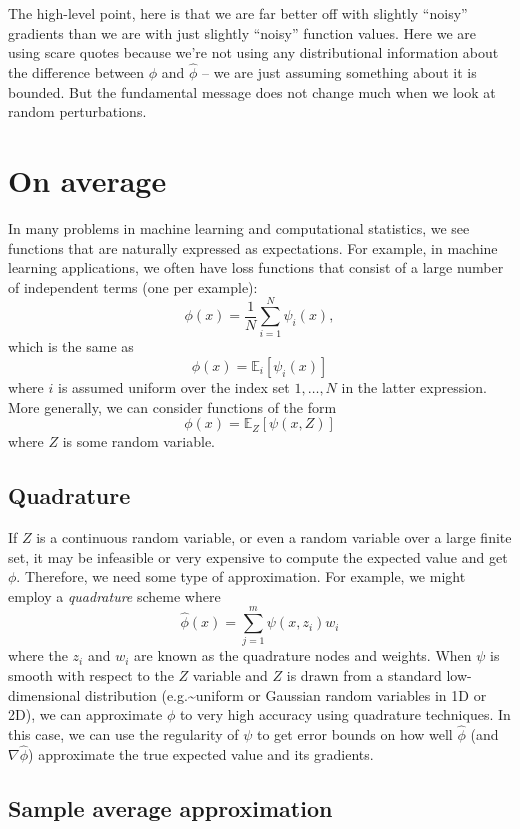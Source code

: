 \documentclass[12pt, leqno]{article} %
\begin{document}
The high-level point, here is that we are far better off with slightly
``noisy'' gradients than we are with just slightly ``noisy'' function
values. Here we are using scare quotes because we're not using any
distributional information about the difference between \(\phi\) and
\(\hat{\phi}\) -- we are just assuming something about it is bounded.
But the fundamental message does not change much when we look at random
perturbations.

\section{On average}

In many problems in machine learning and computational statistics, we
see functions that are naturally expressed as expectations. For example,
in machine learning applications, we often have loss functions that
consist of a large number of independent terms (one per example):
\[\phi(x) = \frac{1}{N} \sum_{i=1}^N \psi_i(x),\] which is the same as
\[\phi(x) = \mathbb{E}_i\left[ \psi_i(x) \right]\] where \(i\) is
assumed uniform over the index set \(1, \ldots, N\) in the latter
expression. More generally, we can consider functions of the form
\[\phi(x) = \mathbb{E}_Z\left[\psi(x, Z)\right]\] where \(Z\) is some
random variable.

\subsection{Quadrature}

If \(Z\) is a continuous random variable, or even a random variable over
a large finite set, it may be infeasible or very expensive to compute
the expected value and get \(\phi\). Therefore, we need some type of
approximation. For example, we might employ a \emph{quadrature} scheme
where \[\hat{\phi}(x) = \sum_{j=1}^m \psi(x, z_i) w_i\] where the
\(z_i\) and \(w_i\) are known as the quadrature nodes and weights. When
\(\psi\) is smooth with respect to the \(Z\) variable and \(Z\) is drawn
from a standard low-dimensional distribution
(e.g.\textasciitilde uniform or Gaussian random variables in 1D or 2D),
we can approximate \(\phi\) to very high accuracy using quadrature
techniques. In this case, we can use the regularity of \(\psi\) to get
error bounds on how well \(\hat{\phi}\) (and \(\nabla \hat{\phi}\))
approximate the true expected value and its gradients.

\subsection{Sample average approximation}
\end{document}
